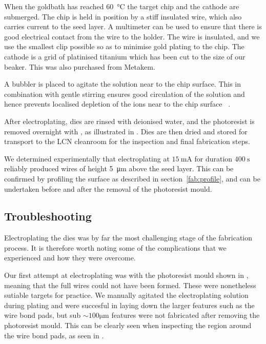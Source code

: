 When the goldbath has reached \SI{60}{\celsius} the target chip and the cathode
are submerged. The chip is held in position by a stiff insulated wire, which
also carries current to the seed layer. A multimeter can be used to ensure that
there is good electrical contact from the wire to the holder. The wire is
insulated, and we use the smallest clip possible so as to minimise gold plating
to the chip.  The cathode is a grid of platinised titanium which has been cut
to the size of our beaker.  This was also purchased from Metakem.


A bubbler is placed to agitate the solution near to the chip surface. This in
combination with gentle stirring ensures good circulation of the solution and
hence prevents localised depletion of the ions near to the chip
surface~\cite{Schlesinger2011} .

After electroplating, dies are rinsed with deionised water, and the photoresist
is removed overnight with , as illustrated
in . Dies are then
dried and stored for transport to the LCN cleanroom for the inspection and
final fabrication steps.

We determined experimentally that electroplating at $\SI{15}{\milli\ampere}$
for duration $\SI{400}{\second}$ reliably produced wires of height
\SI{5}{\micro\meter} above the seed layer. This can be confirmed by profiling
the surface as described in section~\ref{fab:profile}, and can be undertaken
before and after the removal of the photoresist mould. 
%

\subsection{Troubleshooting}

Electroplating the dies was by far the most challenging stage of the
fabrication process.  It is therefore worth noting some of the complications
that we experienced and how they were overcome. 

Our first attempt at electroplating was with the photoresist mould shown in
, meaning that the full wires could not have been
formed. These were nonetheless sutiable targets for practice. We manually
agitated the electroplating solution during plating and were succesful in
laying down the larger features such as the wire bond pads, but sub
$\sim100\si{\micro\meter}$ features were not fabricated after removing the
photoresist mould. This can be clearly seen when inspecting the region around
the wire bond pads, as seen in .

